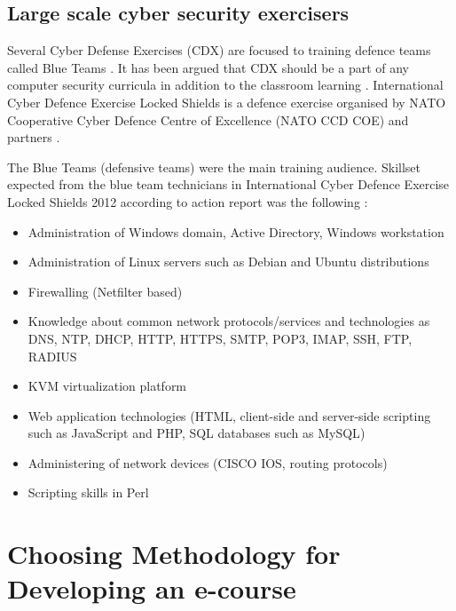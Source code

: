 \subsection{Large scale cyber security exercisers}
Several Cyber Defense Exercises (\gls{CDX}) are focused to training defence teams called Blue Teams \citep{website:NATO_CCD_COE,schepens_CDX}. It has been argued that \gls{CDX} should be a part of  any computer security curricula in addition to the classroom learning \citep{adams_CDX_curricula}. International Cyber Defence Exercise Locked Shields is a defence exercise organised by NATO Cooperative Cyber Defence Centre of Excellence (\gls{NATO CCD COE}) and partners  \citep{website:NATO_CCD_COE}. 

The Blue Teams (defensive teams) were the main training audience.
Skillset expected from the blue team technicians in International Cyber Defence Exercise Locked Shields 2012 according to action report was the following \citep{website:NATO_CCD_COE}:
\begin{itemize}
\item Administration of Windows domain, Active Directory, Windows workstation
\item Administration of Linux servers such as Debian and Ubuntu distributions
\item Firewalling (Netfilter based)
\item Knowledge about common network protocols/services and technologies as \gls{DNS}, \gls{NTP}, \gls{DHCP}, \gls{HTTP}, \gls{HTTPS}, \gls{SMTP}, \gls{POP3}, \gls{IMAP}, \gls{SSH}, \gls{FTP}, \gls{RADIUS}
\item \gls{KVM} virtualization platform
\item Web application technologies (\gls{HTML}, client-side and server-side scripting
such as JavaScript and \gls{PHP}, \gls{SQL} databases such as \gls{MySQL})
\item Administering of network devices (CISCO IOS, routing protocols)
\item Scripting skills in Perl
\end{itemize}

%

\section{Choosing Methodology for Developing an e-course}

